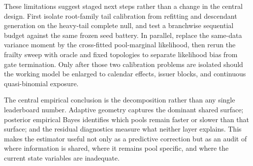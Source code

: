 \documentclass[11pt]{article}
\begin{document}
These limitations suggest staged next steps rather than a change in the central design. First isolate
root-family tail calibration from refitting and descendant generation on the heavy-tail complete null,
and test a branchwise sequential budget against the same frozen seed battery. In parallel, replace the
same-data variance moment by the cross-fitted pool-marginal likelihood, then rerun the frailty sweep with
oracle and fixed topologies to separate likelihood bias from gate termination. Only after those two
calibration problems are isolated should the working model be enlarged to calendar effects, issuer
blocks, and continuous quasi-binomial exposure.

The central empirical conclusion is the decomposition rather than any single leaderboard number.
Adaptive geometry captures the dominant shared surface; posterior empirical Bayes identifies which
pools remain faster or slower than that surface; and the residual diagnostics measure what neither
layer explains. This makes the estimator useful not only as a predictive correction but as an audit
of where information is shared, where it remains pool specific, and where the current state variables
are inadequate.
\end{document}
